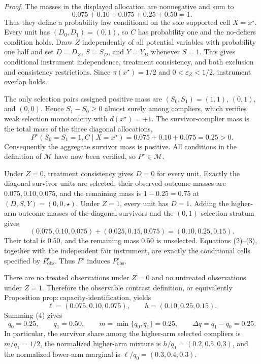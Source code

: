 \noindent\textit{Proof.}
The masses in the displayed allocation are nonnegative and sum to
\[
0.075+0.10+0.075+0.25+0.50=1.
\tag{1}
\]
Thus they define a probability law conditional on the sole supported cell
\(X=x^{\star}\).  Every unit has \((D_0,D_1)=(0,1)\), so \(C\) has
probability one and the no-defiers condition holds.  Draw \(Z\) independently
of all potential variables with probability one half and set \(D=D_Z\),
\(S=S_D\), and \(Y=Y_D\) whenever \(S=1\).  This gives conditional
instrument independence, treatment consistency, and both exclusion and
consistency restrictions.  Since \(\pi(x^{\star})=1/2\) and
\(0<\varepsilon_Z<1/2\), instrument overlap holds.

The only selection pairs assigned positive mass are \((S_0,S_1)=(1,1)\),
\((0,1)\), and \((0,0)\).  Hence \(S_1-S_0\ge0\) almost surely among
compliers, which verifies weak selection monotonicity with
\(d(x^{\star})=+1\).  The survivor-complier mass is the total mass of the
three diagonal allocations,
\[
P^{\star}(S_0=S_1=1,C\mid X=x^{\star})
=0.075+0.10+0.075=0.25>0.
\tag{2}
\]
Consequently the aggregate survivor mass is positive.  All conditions in
the definition of \(\mathcal M\) have now been verified, so
\(P^{\star}\in\mathcal M\).

Under \(Z=0\), treatment consistency gives \(D=0\) for every unit.
Exactly the diagonal survivor units are selected; their observed outcome
masses are \(0.075,0.10,0.075\), and the remaining mass is
\(1-0.25=0.75\) at \((D,S,Y)=(0,0,\star)\).  Under \(Z=1\), every unit
has \(D=1\).  Adding the higher-arm outcome masses of the diagonal
survivors and the \((0,1)\) selection stratum gives
\[
(0.075,0.10,0.075)+(0.025,0.15,0.075)
=(0.10,0.25,0.15).
\tag{3}
\]
Their total is \(0.50\), and the remaining mass \(0.50\) is unselected.
Equations (2)--(3), together with the independent fair instrument, are
exactly the conditional cells specified by \(P_{\mathrm{obs}}^{\star}\).
Thus \(P^{\star}\) induces \(P_{\mathrm{obs}}^{\star}\).

There are no treated observations under \(Z=0\) and no untreated
observations under \(Z=1\).  Therefore the observable contrast definition,
or equivalently Proposition
\(\mathrm{prop{:}capacity\text{-}identification}\), yields
\[
\ell=(0.075,0.10,0.075),\qquad
h=(0.10,0.25,0.15).
\tag{4}
\]
Summing (4) gives
\[
q_0=0.25,\qquad q_1=0.50,\qquad
m=\min\{q_0,q_1\}=0.25,
\qquad \Delta q=q_1-q_0=0.25.
\tag{5}
\]
In particular, the survivor share among the higher-arm selected compliers
is \(m/q_1=1/2\), the normalized higher-arm mixture is
\(h/q_1=(0.2,0.5,0.3)\), and the normalized lower-arm marginal is
\(\ell/q_0=(0.3,0.4,0.3)\).

